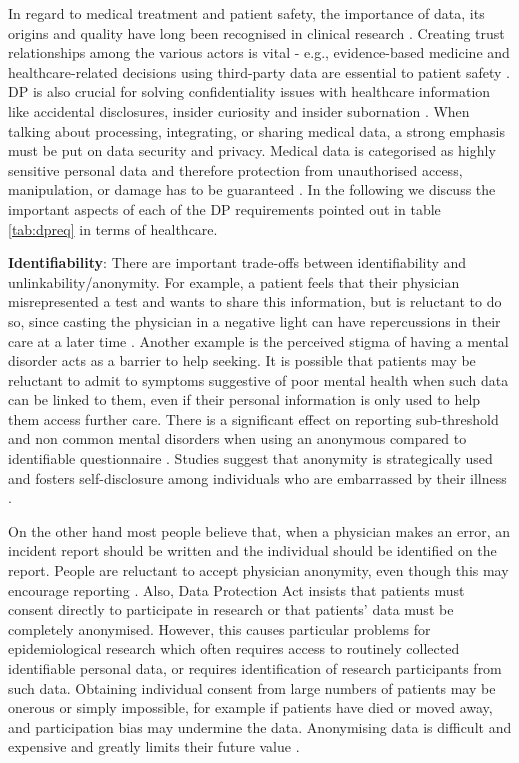 In regard to medical treatment and patient safety, the importance of data, its origins and quality have long been recognised in clinical research \cite{rec_in_clinical_research} \cite{history_in_diagnosis}. Creating trust relationships among the various actors is vital - e.g., evidence-based medicine and healthcare-related decisions using third-party data are essential to patient safety \cite{health_1}. DP is also crucial for solving confidentiality issues with healthcare information like accidental disclosures, insider curiosity and insider subornation \cite{health_confidentiality}. When talking about processing, integrating, or sharing medical data, a strong emphasis must be put on data security and privacy. Medical data is categorised as highly sensitive personal data and therefore protection from unauthorised access, manipulation, or damage has to be guaranteed \cite{cavanillas2016new}. In the following we discuss the important aspects of each of the DP requirements pointed out in table \ref{tab:dpreq} in terms of healthcare.\newline


\textbf{Identifiability}: There are important trade-offs between identifiability and unlinkability/anonymity. For example, a patient feels that their physician misrepresented a test and wants to share this information, but is reluctant to do so, since casting the physician in a negative light can have repercussions in their care at a later time \cite{req_h_anon}. Another example is the perceived stigma of having a mental disorder acts as a barrier to help seeking. It is possible that patients may be reluctant to admit to symptoms suggestive of poor mental health when such data can be linked to them, even if their personal information is only used to help them access further care. There is a significant effect on reporting sub-threshold and non common mental disorders when using an anonymous compared to identifiable questionnaire \cite{mental_health}. Studies suggest that anonymity is strategically used and fosters self-disclosure among individuals who are embarrassed by their illness \cite{anonymity_disclosure}. 

On the other hand most people believe that, when a physician makes an error, an incident report should be written and the individual should be identified on the report. People are reluctant to accept physician anonymity, even though this may encourage reporting \cite{medical_report}. Also, Data Protection Act insists that patients must consent directly to participate in research or that patients' data must be completely anonymised. However, this causes particular problems for epidemiological research \cite{epidemiological_research} which often requires access to routinely collected identifiable personal data, or requires identification of research participants from such data. Obtaining individual consent from large numbers of patients may be onerous or simply impossible, for example if patients have died or moved away, and participation bias may undermine the data. Anonymising data is difficult and expensive and greatly limits their future value \cite{medical_research}. \newline

